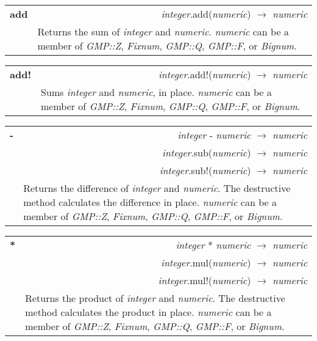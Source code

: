 \documentclass[pdftex,10pt]{article}
\newlength{\methwidth}
\newlength{\defnwidth}
\begin{document}
\begin{tabular}{p{\methwidth} l r}
\toprule
\textbf{add} & & \textit{integer}.add(\textit{numeric}) $\rightarrow$ \textit{numeric} \\
\cmidrule(r){2-3}
& \multicolumn{2}{p{\defnwidth}}{
  Returns the sum of \textit{integer} and \textit{numeric}. \textit{numeric} can be a
  member of \textit{GMP::Z}, \textit{Fixnum}, \textit{GMP::Q}, \textit{GMP::F}, or
  \textit{Bignum}.
}
\end{tabular}
\newline\newline

\begin{tabular}{p{\methwidth} l r}
\toprule
\textbf{add!} & & \textit{integer}.add!(\textit{numeric}) $\rightarrow$
\textit{numeric} \\
\cmidrule(r){2-3}
& \multicolumn{2}{p{\defnwidth}}{
  Sums \textit{integer} and \textit{numeric}, in place. \textit{numeric} can be a
  member of \textit{GMP::Z}, \textit{Fixnum}, \textit{GMP::Q}, \textit{GMP::F}, or
  \textit{Bignum}.
}
\end{tabular}
\newline\newline

\begin{tabular}{p{\methwidth} l r}
\toprule
\textbf{-} & & \textit{integer} - \textit{numeric} $\rightarrow$ \textit{numeric} \\
& & \textit{integer}.sub(\textit{numeric}) $\rightarrow$ \textit{numeric} \\
& & \textit{integer}.sub!(\textit{numeric}) $\rightarrow$ \textit{numeric} \\
\cmidrule(r){2-3}
& \multicolumn{2}{p{\defnwidth}}{
  Returns the difference of \textit{integer} and \textit{numeric}. The destructive method
  calculates the difference in place. \textit{numeric} can be a member of
  \textit{GMP::Z}, \textit{Fixnum}, \textit{GMP::Q}, \textit{GMP::F}, or \textit{Bignum}.
}
\end{tabular}
\newline\newline

\begin{tabular}{p{\methwidth} l r}
\toprule
\textbf{*} & & \textit{integer} * \textit{numeric} $\rightarrow$ \textit{numeric} \\
& & \textit{integer}.mul(\textit{numeric}) $\rightarrow$ \textit{numeric} \\
& & \textit{integer}.mul!(\textit{numeric}) $\rightarrow$ \textit{numeric} \\
\cmidrule(r){2-3}
& \multicolumn{2}{p{\defnwidth}}{
  Returns the product of \textit{integer} and \textit{numeric}. The destructive method
  calculates the product in place. \textit{numeric} can be a member of \textit{GMP::Z},
  \textit{Fixnum}, \textit{GMP::Q}, \textit{GMP::F}, or \textit{Bignum}.
}
\end{tabular}
\newline\newline
\end{document}
